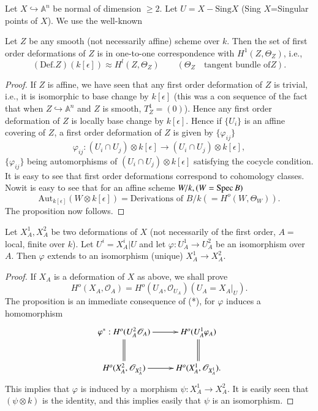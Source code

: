 {Let $X\hookrightarrow \mathbb{A}^{n}$ be normal of dimension $\ge
2$. Let $U=X-\text{Sing} X$ (Sing $X$=Singular points of $X$). We use
the well-known 

\begin{proposition}\label{part1-prop9.1}%
Let $Z$ be any smooth (not necessarily affine) scheme over $k$. Then
the set of first order deformations of $Z$ is in one-to-one
correspondence with $H^1(Z, \Theta_{Z})$, i.e., 
$$
(\text{Def}.Z)(k[\epsilon])\approx H^{l}(Z, \Theta_Z)\qquad
(\Theta_Z\quad\text{tangent bundle of}  Z). 
$$
\end{proposition}

\begin{proof}
If $Z$ is affine, we have seen that any first order deformation of $Z$
is trivial, i.e., it is isomorphic to base change by $k[\epsilon]$
(this was a con sequence of the fact that when
$Z\hookrightarrow \mathbb{A}^{n}$ and $Z$ is smooth,
$T^1_Z=(0)$). Hence any first order deformation of $Z$ is locally
base change by $k[\epsilon]$. Hence if $\{U_i\}$  is an affine
covering of $Z$, a first order deformation of $Z$ is given by
$\{\varphi_{ij}\}$ 
$$
\varphi_{ij}:(U_i\cap U_j)\otimes k[\epsilon]\to (U_i\cap U_j)\otimes
k[\epsilon], 
$$
$\{\varphi_{ij}\}$ being automorphisms of $(U_i\cap U_j)\otimes
k[\epsilon]$ satisfying the cocycle condition. It is easy to see that
first order deformations correspond to cohomology
classes. Now\pageoriginale it is easy to see that for an affine scheme
$W/k, (W=\operatorname{Spec} B)$ 
$$
\text{Aut}_{k[\epsilon]}(W\otimes k[\epsilon])=\text{Derivations of } B/k (=H^{o}(W, \Theta_{W})).
$$
The proposition now follows.
\end{proof}

\begin{lemma}\label{part1-lem9.1}%
Let $X^{1}_A, X^{2}_A$ be two deformations of $X$ (not necessarily of the first order, $A= $local, finite over $k$). Let $U^{i}=X^{i}_A\big |U$ and let $\varphi:U^{1}_A\to U^{2}_A$ be an isomorphism over $A$. Then $\varphi$ extends to an isomorphism (unique) $X^{1}_A\to X^{2}_A$.
\end{lemma}

\begin{proof}
If $X_A$ is a deformation of $X$ as above, we shall prove
\begin{equation*}
H^{o}(X_A, \mathscr{O}_A)=H^{o}(U_A, \mathscr{O}_{U_{A}})(U_A=X_A\big |_{U})\tag{*}.
\end{equation*}
The proposition is an immediate consequence of (*), for $\varphi$ induces a homomorphism
\begin{equation*}
\xymatrix{
\varphi^{\ast}:H^{o}(U^{2}_A\ar@{=} [d], \mathscr{O}_A)\ar[r]&H^{o}(U^{1}_A\ar@{=} [d], \varphi_A)\\
 H^{o}(X^{2}_A, \mathscr{O}_{X^{2}_{A}})\ar [r]& H^{o}(X^{1}_A, \mathscr{O}_{X^{1}_{A}}).
}
\end{equation*}
This implies that $\varphi$ is induced by a morphism $\psi: X^{1}_A\to
X^{2}_A$. It is easily seen that $(\psi \otimes k)$ is the identity,
and this implies easily that $\psi$ is an isomorphism. 


\end{proof}}

